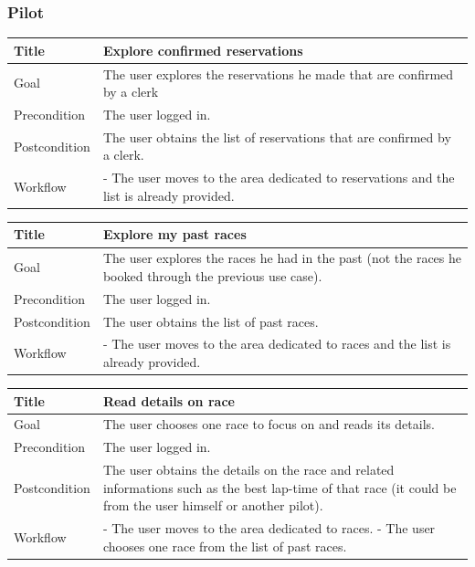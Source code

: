 \documentclass{beamer}
\begin{document}
\begin{frame}
    \frametitle{Pilot}
    \begin{table}
        \tiny
        \begin{tabular}{|p{2cm}|p{6cm}|}
        \hline
        Title & \textbf{Explore confirmed reservations} \\
        \hline
        Goal & The user explores the reservations he made that are confirmed by a clerk \\
        \hline
        Precondition & The user logged in. \\
        \hline
        Postcondition & The user obtains the list of reservations that are confirmed by a clerk. \\
        \hline
        Workflow &
        - The user moves to the area dedicated to reservations and the list is already provided. \\
        \hline
        \end{tabular}
\end{table}

\begin{table}
    \tiny
    \begin{tabular}{|p{2cm}|p{6cm}|}
    \hline
    Title & \textbf{Explore my past races} \\
    \hline
    Goal & The user explores the races he had in the past (not the races he booked through the previous 
    use case). \\
    \hline
    Precondition & The user logged in. \\
    \hline  
    Postcondition & The user obtains the list of past races. \\
    \hline
    Workflow &
    - The user moves to the area dedicated to races
    and the list is already provided. \\
    \hline
    \end{tabular}
\end{table}

\begin{table}
    \tiny
    \begin{tabular}{|p{2cm}|p{6cm}|}
    \hline
    Title & \textbf{Read details on race} \\
    \hline
    Goal & The user chooses one race to focus on and reads its details. \\
    \hline
    Precondition & The user logged in. \\
    \hline
    Postcondition & The user obtains the details on the race and related informations such as the best lap-time of
    that race (it could be from the user himself or another pilot). \\
    \hline
    Workflow &
    - The user moves to the area dedicated to races. \newline
    - The user chooses one race from the list of past races. \\
    \hline
    \end{tabular}
\end{table}

\end{frame}
\end{document}
